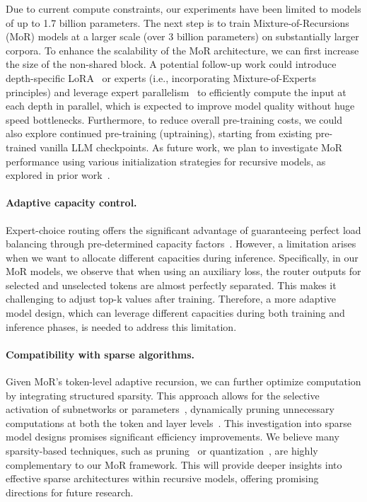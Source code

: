Due to current compute constraints, our experiments have been limited to models of up to 1.7 billion parameters.
The next step is to train Mixture-of-Recursions (MoR) models at a larger scale (over 3 billion parameters) on substantially larger corpora. To enhance the scalability of the MoR architecture, we can first increase the size of the non-shared block. A potential follow-up work could introduce depth-specific LoRA~\citep{bae2024relaxed} or experts (i.e., incorporating Mixture-of-Experts principles) and leverage expert parallelism~\citep{rajbhandari2022deepspeed} to efficiently compute the input at each depth in parallel, which is expected to improve model quality without huge speed bottlenecks. Furthermore, to reduce overall pre-training costs, we could also explore continued pre-training (uptraining), starting from existing pre-trained vanilla LLM checkpoints. As future work, we plan to investigate MoR performance using various initialization strategies for recursive models, as explored in prior work~\citep{bae2024relaxed}.



\vspace{-12pt}
\paragraph{Adaptive capacity control.}
Expert-choice routing offers the significant advantage of guaranteeing perfect load balancing through pre-determined capacity factors~\citep{raposo2024mixture, zhou2022mixture}. However, a limitation arises when we want to allocate different capacities during inference. Specifically, in our MoR models, we observe that when using an auxiliary loss, the router outputs for selected and unselected tokens are almost perfectly separated. This makes it challenging to adjust top-k values after training. Therefore, a more adaptive model design, which can leverage different capacities during both training and inference phases, is needed to address this limitation.



\vspace{-12pt}
\paragraph{Compatibility with sparse algorithms.}

Given MoR's token-level adaptive recursion, we can further optimize computation by integrating structured sparsity. This approach allows for the selective activation of subnetworks or parameters~\citep{liu2023deja}, dynamically pruning unnecessary computations at both the token and layer levels~\citep{raposo2024mixture, elhoushi2024layerskip}. This investigation into sparse model designs promises significant efficiency improvements. We believe many sparsity-based techniques, such as pruning~\citep{han2015learning} or quantization~\citep{jacob2018quantization}, are highly complementary to our MoR framework. This will provide deeper insights into effective sparse architectures within recursive models, offering promising directions for future research.



